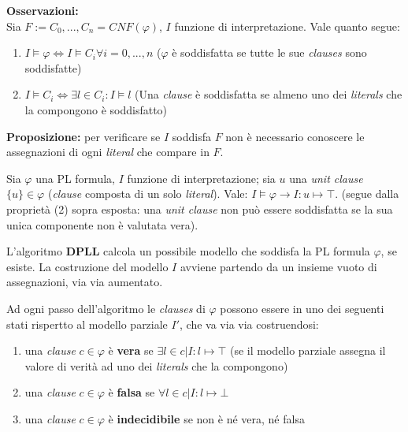 \begin{fdefinition}
\textbf{Osservazioni:}\\
Sia $F := C_0, ..., C_n = CNF (\varphi)$, $I$ funzione di interpretazione. Vale quanto segue:
\begin{enumerate}
\item $I \models \varphi \iff I \models C_i \forall i = 0, ..., n$ ($\varphi$ è soddisfatta se tutte le sue \textit{clauses} sono soddisfatte)
\item $I \models C_i \iff \exists l \in C_i : I \models l$ (Una \textit{clause} è soddisfatta se almeno uno dei \textit{literals} che la compongono è soddisfatto)
\end{enumerate}
\textbf{Proposizione: } per verificare se $I$ soddisfa $F$ non è necessario conoscere le assegnazioni di ogni \textit{literal} che compare in $F$.
\end{fdefinition}

\begin{fdefinition}
Sia $\varphi$ una PL formula, $I$ funzione di interpretazione; sia $u$ una \textit{unit clause} $\lbrace u \rbrace \in \varphi$ (\textit{clause} composta di un solo \textit{literal}). Vale: $I \models \varphi \to I: u \mapsto \top$. (segue dalla proprietà (2) sopra esposta: una \textit{unit clause} non può essere soddisfatta se la sua unica componente non è valutata vera).
\end{fdefinition}

L'algoritmo \textbf{DPLL} calcola un possibile modello che soddisfa la PL formula $\varphi$, se esiste. La costruzione del modello $I$ avviene partendo da un insieme vuoto di assegnazioni, via via aumentato.

Ad ogni passo dell'algoritmo le \textit{clauses} di $\varphi$ possono essere in uno dei seguenti stati rispertto al modello parziale $I'$, che va via via costruendosi:
\begin{enumerate}
\item una \textit{clause} $c \in \varphi$ è \textbf{vera} se $\exists l \in c | I: l \mapsto \top$ (se il modello parziale assegna il valore di verità ad uno dei \textit{literals} che la compongono)
\item una \textit{clause} $c \in \varphi$ è \textbf{falsa} se $\forall l \in c | I: l \mapsto \bot$
\item una \textit{clause} $c \in \varphi$ è \textbf{indecidibile} se non è né vera, né falsa
\end{enumerate}

